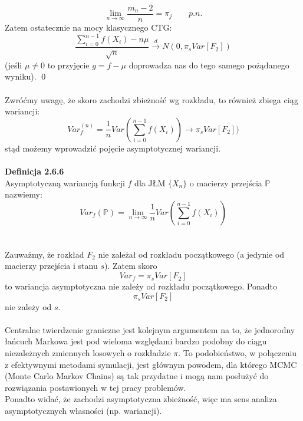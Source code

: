 \documentclass[a4paper]{article}
\begin{document}
$$ \lim\limits_{n \to \infty} \frac{m_n -2}{n} = \pi_j \quad\quad p.n.$$
Zatem ostatecznie na mocy klasycznego CTG:
$$\frac{\sum\limits_{i=0}^{n-1} f(X_i) - n\mu}{\sqrt{n}} \overset{d}{\to} N(0, \pi_s Var[F_2])$$
(jeśli $\mu \neq 0$ to przyjęcie $g = f - \mu$ doprowadza nas do tego samego pożądanego wyniku). \qed
\\\\
Zwróćmy uwagę, że skoro zachodzi zbieżność wg rozkładu, to również zbiega ciąg wariancji:
$$Var_f^{(n)} = \frac{1}{n} Var\left(\sum\limits_{i=0}^{n-1} f(X_i)\right) \to \pi_s Var[F_2])$$
stąd możemy wprowadzić pojęcie asymptotycznej wariancji.\\\\
\textbf{Definicja 2.6.6}\\
Asymptotyczną wariancją funkcji $f$ dla JŁM $\{X_n\}$ o macierzy przejścia $\mathbb{P}$ nazwiemy:
$$Var_{f}(\mathbb{P}) = \lim\limits_{n \to \infty} \frac{1}{n} Var\left(\sum\limits_{i=0}^{n-1} f(X_i)\right)$$
\\\\
Zauważmy, że rozkład $F_2$ nie zależał od rozkładu początkowego (a jedynie od macierzy przejścia i stanu $s$). Zatem skoro $$Var_f = \pi_s Var[F_2]$$
to wariancja asymptotyczna nie zależy od rozkładu początkowego. Ponadto
$$\pi_s Var[F_2]$$
nie zależy od $s$.\\\\
Centralne twierdzenie graniczne jest kolejnym argumentem na to, że jednorodny łańcuch Markowa jest pod wieloma względami bardzo podobny do ciągu niezależnych zmiennych losowych o rozkładzie $\pi$. To podobieństwo, w połączeniu z efektywnymi metodami symulacji, jest głównym powodem, dla którego MCMC (Monte Carlo Markov Chains) są tak przydatne i mogą nam posłużyć do rozwiązania postawionych w tej pracy problemów.\\
Ponadto widać, że zachodzi asymptotyczna zbieżność, więc ma sens analiza asymptotycznych własności (np. wariancji).
\end{document}
